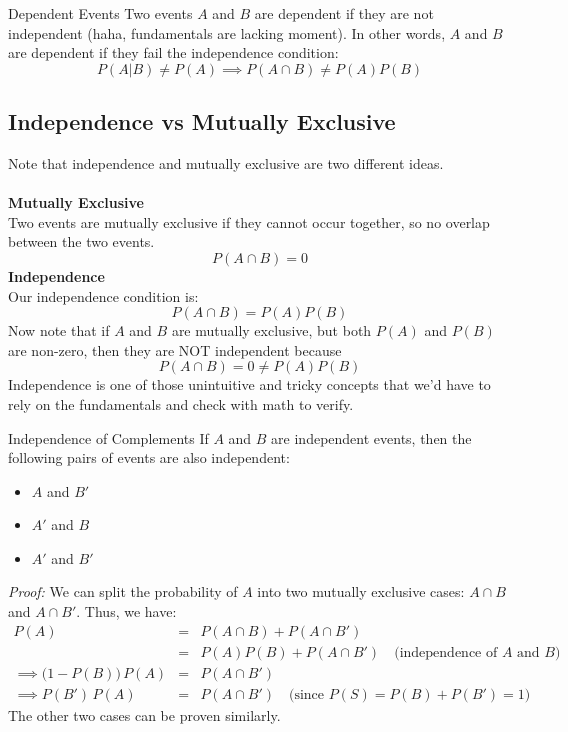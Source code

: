 ﻿\documentclass[12pt]{article}
\begin{document}
\begin{definition}{Dependent Events}
    Two events $A$ and $B$ are dependent if they are not independent (haha, fundamentals are lacking moment). In other words, $A$ and $B$ are dependent if they fail the independence condition:
    \[P(A | B) \neq P(A) \implies P(A \cap B) \neq P(A)P(B)\]
\end{definition}

\subsection*{Independence vs Mutually Exclusive}
Note that independence and mutually exclusive are two different ideas.\\\\
\textbf{Mutually Exclusive}\\
Two events are mutually exclusive if they cannot occur together, so no overlap between the two events. 
\[P(A \cap B) = 0\]
\textbf{Independence}\\
Our independence condition is:
\[P(A \cap B) = P(A)P(B)\]
Now note that if $A$ and $B$ are mutually exclusive, but both $P(A)$ and $P(B)$ are non-zero, then they are NOT independent because
\[P(A \cap B) = 0 \neq P(A)P(B)\]
Independence is one of those unintuitive and tricky concepts that we'd have to rely on the fundamentals and check with math to verify.

\begin{theorem}{Independence of Complements}
    If $A$ and $B$ are independent events, then the following pairs of events are also independent:
    \begin{itemize}
        \item $A$ and $B'$
        \item $A'$ and $B$
        \item $A'$ and $B'$
    \end{itemize}
    \textit{Proof:} We can split the probability of $A$ into two mutually exclusive cases: $A \cap B$ and $A \cap B'$. Thus, we have:
    \begin{eqnarray*}
        P(A) &=& P(A \cap B) + P(A \cap B')\\
        &=& P(A)P(B) + P(A \cap B') \quad \text{(independence of $A$ and $B$)}\\
        \implies \big(1 - P(B)\big)\,P(A) &=& P(A \cap B')\\
        \implies P(B')\,P(A) &=& P(A \cap B') \quad \text{(since $P(S) = P(B) + P(B') = 1$)}
    \end{eqnarray*}
    The other two cases can be proven similarly.
\end{theorem}
\end{document}
